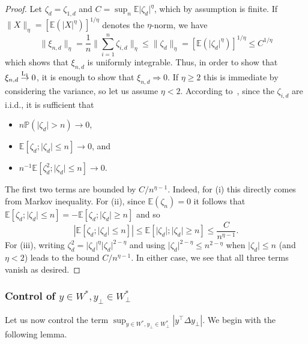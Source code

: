 \documentclass[]{article}
\newcommand{\E}{\mathbb{E}}
\renewcommand{\P}{\mathbb{P}}
\newcommand{\lone}{\stackrel{\text{\textnormal{L\textsubscript{1}}}}{\to}}
\theoremstyle{plain}
\theoremstyle{definition}
\begin{document}
\begin{proof}
	Let $\zeta_d = \zeta_{1,d}$ and $C = \sup_n \E \lvert \zeta_d \rvert^\eta$, which by assumption is finite. If $\lVert X \rVert_\eta = [\E(\lvert X \rvert^\eta)]^{1/\eta}$ denotes the $\eta$-norm, we have
	\[ \lVert \xi_{n,d} \rVert_\eta = \frac{1}{n} \Big \lVert \sum_{i=1}^n \zeta_{i,d} \Big \rVert_\eta \leq \lVert \zeta_d \rVert_\eta = [\E (\lvert \zeta_d \rvert^\eta)]^{1/\eta} \leq C^{1/\eta} \]
	which shows that $\xi_{n,d}$ is uniformly integrable. Thus, in order to show that $\xi_{n,d} \lone 0$, it is enough to show that $\xi_{n,d} \Rightarrow 0$. If $\eta \geq 2$ this is immediate by considering the variance, so let us assume $\eta < 2$. According to~\cite[Theorem 2.2.11]{Durrett_2019}, since the $\zeta_{i,d}$ are i.i.d., it is sufficient that
	\begin{itemize}
	\item[(i)] $n \P(\lvert \zeta_d \rvert > n) \to 0$,
	\item[(ii)] $\E[ \zeta_d ; \lvert \zeta_d \rvert \leq n] \to 0$, and
	\item[(iii)] $n^{-1} \E[ \zeta_d^2 ; \lvert \zeta_d \rvert \leq n] \to 0$.
	\end{itemize}
	The first two terms are bounded by $C/n^{\eta-1}$. Indeed, for (i) this directly comes from Markov inequality. For (ii), since $\E(\zeta_n) = 0$ it follows that $\E[ \zeta_d ; \lvert \zeta_d \rvert \leq n] = -\E[ \zeta_d ; \lvert \zeta_d \rvert \geq n]$ and so
	\[ \left \lvert \E[ \zeta_d ; \lvert \zeta_d \rvert \leq n]\right \rvert \leq \E[ \lvert \zeta_d \rvert ; \lvert \zeta_d \rvert \geq n] \leq \frac{C}{n^{\eta-1}}. \]
	For (iii), writing $\zeta_d^2 = \lvert \zeta_d \rvert^\eta \lvert \zeta_d \rvert^{2-\eta}$ and using $\lvert \zeta_d \rvert^{2-\eta} \leq n^{2-\eta}$ when $\lvert \zeta_d \rvert \leq n$ (and $\eta < 2$) leads to the bound $C / n^{\eta-1}$. In either case, we see that all three terms vanish as desired.
\end{proof}





\subsubsection{Control of $y \in W^*, y_\perp \in W^*_\perp$}

Let us now control the term $\sup_{y \in W^*, y_\perp \in W^*_\perp} \left \lvert y^\top \Delta y_\perp \right \rvert$. We begin with the following lemma.
\end{document}
